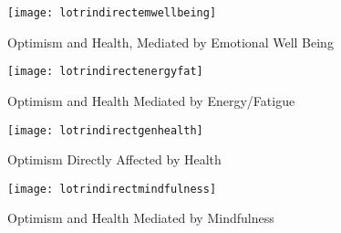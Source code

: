 \documentclass{article}
\begin{document}





\begin{figure}
  \texttt{[image: lotrindirectemwellbeing]}
  \caption{Optimism and Health, Mediated by Emotional Well Being}
  \label{fig:lotrhealthemwellbeing}
\end{figure}



\begin{figure}
  \texttt{[image: lotrindirectenergyfat]}
  \caption{Optimism and Health Mediated by Energy/Fatigue}
  \label{fig:lotrhealthenergyfat}
\end{figure}




\begin{figure}
  \texttt{[image: lotrindirectgenhealth]}
  \caption{Optimism Directly Affected by Health}
  \label{fig:optindirectgenhealth}
\end{figure}


\begin{figure}
  \texttt{[image: lotrindirectmindfulness]}
  \caption{Optimism and Health Mediated by Mindfulness}
  \label{fig:lotrhealthmind2}
\end{figure}
\end{document}
